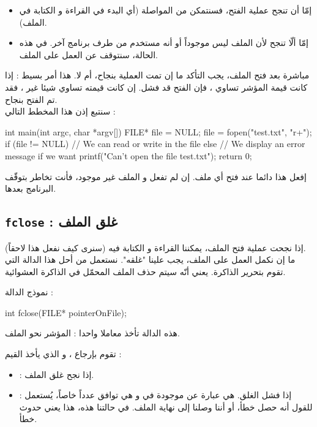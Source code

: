 \begin{itemize}
  \item إمّا أن تنجح عملية الفتح، فسنتمكن من المواصلة (أي البدء في القراءة و الكتابة في الملف).
  \item إمّا ألّا تنجح لأن الملف ليس موجوداً أو أنه مستخدم من طرف برنامج آخر. في هذه الحالة، سنتوقف عن العمل على الملف.
\end{itemize}

مباشرة بعد فتح الملف، يجب التأكد ما إن تمت العملية بنجاح، أم لا. هذا أمر بسيط : إذا كانت قيمة المؤشر تساوي
،
فإن الفتح قد فشل. إن كانت قيمته تساوي شيئا غير
،
فقد تم الفتح بنجاح.\\
سنتبع إذن هذا المخطط التالي :

\begin{Csource}
int main(int argc, char *argv[])
{
	FILE* file = NULL;
	file = fopen("test.txt", "r+");
	if (file != NULL)
	{
    		// We can read or write in the file
	}
	else
	{
    		// We display an error message if we want
    		printf("Can't open the file test.txt");
	}
	return 0;
}
\end{Csource}

إفعل هذا دائما عند فتح أي ملف. إن لم تفعل و الملف غير موجود، فأنت تخاطر بتوقّف البرنامج بعدها.

\subsection{\texttt{fclose} : غلق الملف}
إذا نجحت عملية فتح الملف، يمكننا القراءة و الكتابة فيه (سنرى كيف نفعل هذا لاحقاً).\\
ما إن نكمل العمل على الملف، يجب علينا "غلقه". نستعمل من أحل هذا الدالة
التي تقوم بتحرير الذاكرة. يعني أنّه سيتم حذف الملف المحمّل في الذاكرة العشوائية.

نموذج الدالة :

\begin{Csource}
int fclose(FILE* pointerOnFile);
\end{Csource}

هذه الدالة تأخذ معاملا واحدا : المؤشر نحو الملف.

تقوم بإرجاع
،
و الذي يأخذ القيم :

\begin{itemize}
  \item {} : إذا نجح غلق الملف.
  \item {} : إذا فشل الغلق.
هي عبارة عن
موجودة في
و هي توافق عدداً خاصاً، يُستعمل للقول أنه حصل خطأ، أو أننا وصلنا إلى نهاية الملف. في حالتنا هذه، هذا يعني حدوث خطأ.
\end{itemize}

